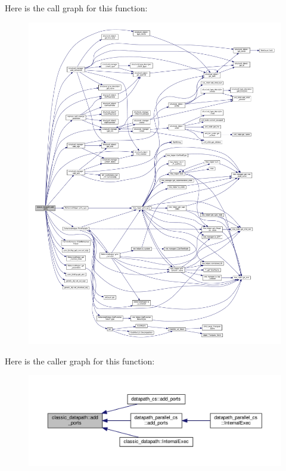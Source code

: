 Here is the call graph for this function\+:
\nopagebreak
\begin{figure}[H]
\begin{center}
\leavevmode
\includegraphics[width=350pt]{d3/d74/classclassic__datapath_a857c8c07a0bb612dd5e36bba9c48a14d_cgraph}
\end{center}
\end{figure}
Here is the caller graph for this function\+:
\nopagebreak
\begin{figure}[H]
\begin{center}
\leavevmode
\includegraphics[width=350pt]{d3/d74/classclassic__datapath_a857c8c07a0bb612dd5e36bba9c48a14d_icgraph}
\end{center}
\end{figure}
\mbox{\label{classclassic__datapath_a2630a430a4a5513d7d6ce4b8a37b3dff}} 
